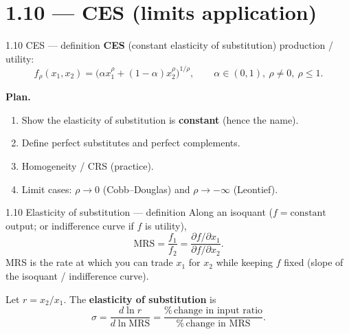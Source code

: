 \documentclass[11pt,aspectratio=169]{beamer}
\begin{document}
\section{1.10 --- CES (limits application)}

\begin{frame}{1.10 CES --- definition}
  \footnotesize
  \textbf{CES} (constant elasticity of substitution) production / utility:
  \[
    f_{\rho}(x_1,x_2)
    =\bigl(\alpha x_1^{\rho}+(1-\alpha)x_2^{\rho}\bigr)^{1/\rho},
    \qquad
    \alpha\in(0,1),\ \rho\neq 0,\ \rho\le 1.
  \]

  \medskip
  \textbf{Plan.}
  \begin{enumerate}\itemsep2pt
    \item Show the elasticity of substitution is \textbf{constant} (hence the name).
    \item Define perfect substitutes and perfect complements.
    \item Homogeneity / CRS (practice).
    \item Limit cases: $\rho\to 0$ (Cobb--Douglas) and $\rho\to-\infty$ (Leontief).
  \end{enumerate}
\end{frame}

\begin{frame}{1.10 Elasticity of substitution --- definition}
  \footnotesize
  Along an isoquant ($f=\text{constant}$ output; or indifference curve if $f$ is utility),
  \[
    \mathrm{MRS}
    =\frac{f_1}{f_2}
    =\frac{\partial f/\partial x_1}{\partial f/\partial x_2}.
  \]
  MRS is the rate at which you can trade \(x_1\) for \(x_2\) while keeping \(f\) fixed
  (slope of the isoquant / indifference curve).

  \medskip
  Let $r=x_2/x_1$. The \textbf{elasticity of substitution} is
  \[
    \sigma
    =\frac{d\ln r}{d\ln\mathrm{MRS}}
    =\frac{\%\,\text{change in input ratio}}{\%\,\text{change in MRS}}.
  \]
\end{frame}
\end{document}
